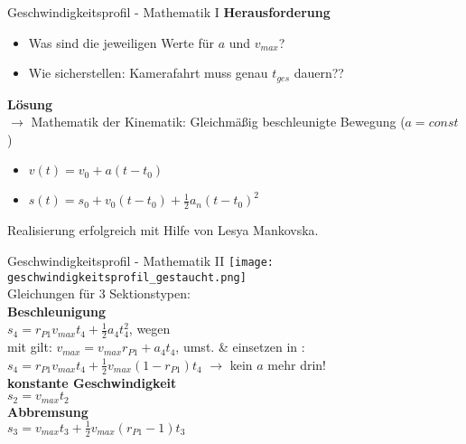 
\begin{frame}{Geschwindigkeitsprofil - Mathematik I}
	\textbf{Herausforderung}\\
	\begin{itemize}
		\pause\item Was sind die jeweiligen Werte für $a$ und $v_{max}$?
		\pause\item Wie sicherstellen: Kamerafahrt muss genau $t_{ges}$ dauern??
	\end{itemize}
	\pause\textbf{Lösung}\\
	\vspace{0.1cm}
	$\rightarrow$ Mathematik \pause der Kinematik: \pause Gleichmäßig beschleunigte Bewegung {\color{gray}($a = const$)}
	\begin{itemize}
		\pause\item{} $v(t) = v_0 + a (t - t_0)$\\
		\pause\item{} $s(t) = s_0 + v_0 (t - t_0) + \frac{1}{2} a_n (t - t_0)^2$
	\end{itemize}
	\pause Realisierung erfolgreich mit Hilfe von Lesya Mankovska.
\end{frame}


\begin{frame}{Geschwindigkeitsprofil - Mathematik II}
	\texttt{[image: geschwindigkeitsprofil\_gestaucht.png]}\\
	 Gleichungen für 3 Sektionstypen:\\
	\vspace{0.2cm}
	\pause\textbf{Beschleunigung}\\
	\vspace{0.1cm}
	\pause{} $s_4 = r_{P1} v_{max} t_4 + \frac{1}{2} a_4 t_4^2$, wegen \\
	\pause mit  gilt: $v_{max} = v_{max} r_{P1} + a_4 t_4$\pause, umst. \& einsetzen in :\\
	\vspace{0.1cm}
	\pause\hspace*{10mm}$s_4 = r_{P1} v_{max} t_4 + \frac{1}{2} v_{max} (1 - r_{P1}) t_4$ \pause$\rightarrow$ kein $a$ mehr drin!\\
	\vspace{0.3cm}
	\pause\textbf{konstante Geschwindigkeit}\\
	\vspace{0.1cm}
	\pause{} $s_2 = v_{max} t_2$\\
	\vspace{0.3cm}
	\pause\textbf{Abbremsung}\\
	\vspace{0.1cm}
	\pause{} $s_3 = v_{max} t_3 + \frac{1}{2} v_{max} (r_{P1} - 1) t_3$
\end{frame}

